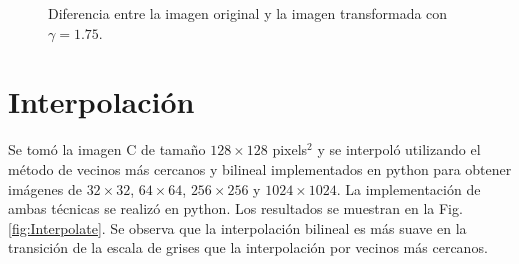 \documentclass[11pt,twocolumn,twoside]{opticajnl}
\begin{document}
\begin{figure}[h]
\begin{subfigure}[h]{0.24\linewidth}
        \end{subfigure}
                \caption{Diferencia entre la imagen original y la imagen transformada con $\gamma = 1.75$.}
                \label{fig:Exptrans1.75_sustraction}
\end{figure}

\section{Interpolación \label{sec:ej3}}

\vspace{0.3cm}

Se tomó la imagen C de tamaño $128\times128$ pixels$^2$ y se interpoló utilizando el método de vecinos más cercanos y bilineal implementados en python para obtener imágenes de $32\times32$, $64\times64$, $256\times256$ y $1024\times1024$. La implementación de ambas técnicas se realizó en python. Los resultados se muestran en la Fig. \ref{fig:Interpolate}. Se observa que la interpolación bilineal es más suave en la transición de la escala de grises que la interpolación por vecinos más cercanos.
\end{document}
